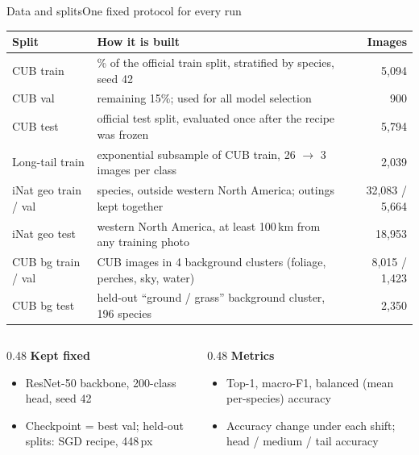 \documentclass[aspectratio=169,10pt]{beamer}
\begin{document}
\begin{frame}{Data and splits}{One fixed protocol for every run}
\footnotesize\renewcommand{\arraystretch}{0.95}
\begin{tabularx}{\linewidth}{@{}l >{\raggedright\arraybackslash}X r@{}}
\toprule
\textbf{Split} & \textbf{How it is built} & \textbf{Images}\\
\midrule
CUB train & 85\% of the official train split, stratified by species, seed 42 & 5,094\\
CUB val & remaining 15\%; used for all model selection & 900\\
CUB test & official test split, evaluated once after the recipe was frozen & 5,794\\
Long-tail train & exponential subsample of CUB train, 26 $\to$ 3 images per class & 2,039\\
iNat geo train / val & 156 species, outside western North America; outings kept together & 32,083 / 5,664\\
iNat geo test & western North America, at least 100\,km from any training photo & 18,953\\
CUB bg train / val & CUB images in 4 background clusters (foliage, perches, sky, water) & 8,015 / 1,423\\
CUB bg test & held-out ``ground / grass'' background cluster, 196 species & 2,350\\
\bottomrule
\end{tabularx}

\vspace{0.15cm}
\begin{columns}[t]
\begin{column}{0.48\textwidth}
\textbf{Kept fixed}
\begin{itemize}\small
  \item ResNet-50 backbone, 200-class head, seed 42
  \item Checkpoint = best val; held-out splits: SGD recipe, 448\,px
\end{itemize}
\end{column}
\begin{column}{0.48\textwidth}
\textbf{Metrics}
\begin{itemize}\small
  \item Top-1, macro-F1, balanced (mean per-species) accuracy
  \item Accuracy change under each shift; head / medium / tail accuracy
\end{itemize}
\end{column}
\end{columns}
\end{frame}
\end{document}

